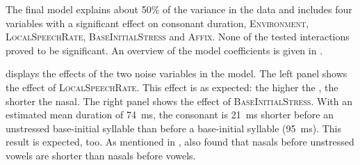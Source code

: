 The final model explains about 50\% of the variance in the data and includes four variables with a significant effect on consonant duration, \textsc{Environment}, \textsc{LocalSpeechRate}, \textsc{BaseInitialStress} and \textsc{Affix}. None of the tested interactions proved to be significant. 
An overview of the model coefficients is given in .%



\begin{table}

	\caption{ Summary of linear model for variables predicting the Box-Cox-transformed duration of [m] in prefixed words}
	\label{tbl: summary model2}
	
	

\end{table}


 displays the effects of the two noise variables in the model. The left panel shows the effect of  \textsc{LocalSpeechRate}. This effect is as expected: 
the higher the , the shorter the nasal. The right panel shows the effect of \textsc{BaseInitialStress}. With an estimated mean duration of 74~ms, the consonant is 21~ms shorter before an unstressed base-initial syllable than before a  base-initial syllable (95~ms). This result is expected, too. As mentioned in , \cite{Umeda.1977} also found that nasals before unstressed vowels are shorter than nasals before  vowels.

